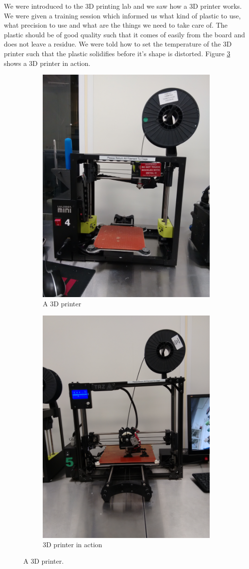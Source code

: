 \documentclass[index=totoc,hyperref,openany]{labbook} %
\begin{document}
We were introduced to the 3D printing lab and we saw how a 3D printer works. We were given a training session which informed us what kind of plastic to use, what precision to use and what are the things we need to take care of. The plastic should be of good quality such that it comes of easily from the board and does not leave a residue. We were told how to set the temperature of the 3D printer such that the plastic solidifies before it's shape is distorted.
Figure \ref{fig:3dprinter} shows a 3D printer in action.
\begin{figure}[H] %
\begin{subfigure}{.5\textwidth}
  \centering
  \includegraphics[width=.5\linewidth]{3d_printer}
  \caption{A 3D printer}
  \label{fig:3d_printer}
\end{subfigure}%
\begin{subfigure}{.5\textwidth}
  \centering
  \includegraphics[width=.5\linewidth]{3d_printer_in_progress}
  \caption{3D printer in action}
  \label{fig:3d_printer_in_progress}
\end{subfigure}
\caption{A 3D printer.}
\label{fig:3dprinter}
\end{figure}
\end{document}
